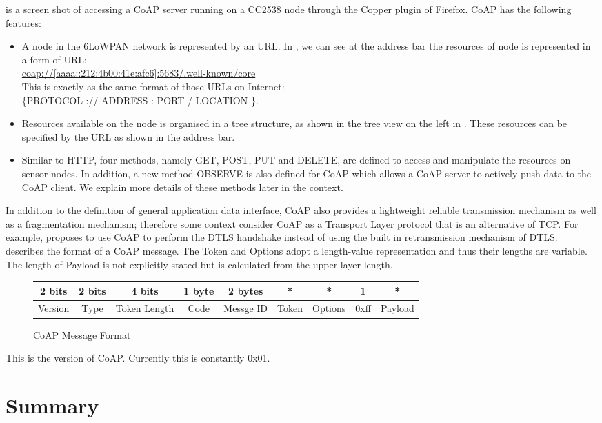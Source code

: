  is a screen shot of accessing a CoAP server running on a CC2538 node through the Copper plugin of Firefox. CoAP has the following features:
\begin{itemize}
	\item A node in the 6LoWPAN network is represented by an URL. In , we can see at the address bar the resources of node is represented in a form of URL:\\
	\url{coap://[aaaa::212:4b00:41e:afc6]:5683/.well-known/core} \\
	This is exactly as the same format of those URLs on Internet: \\
	 \{PROTOCOL :// ADDRESS : PORT / LOCATION \}.
	 \item Resources available on the node is organised in a tree structure, as shown in the tree view on the left in . These resources can be specified by the URL as shown in the address bar.
	 \item Similar to HTTP, four methods, namely GET, POST, PUT and DELETE, are defined to access and manipulate the resources on sensor nodes. In addition, a new method OBSERVE is also defined for CoAP which allows a CoAP server to actively push data to the CoAP client. We explain more details of these methods later in the context.
\end{itemize}
In addition to the definition of general application data interface, CoAP also provides a lightweight reliable transmission mechanism as well as a fragmentation mechanism; therefore some context consider CoAP as a Transport Layer protocol that is an alternative of TCP. For example, \cite{CoDTLS} proposes to use CoAP to perform the DTLS handshake instead of using the built in retransmission mechanism of DTLS.
 describes the format of a CoAP message. The Token and Options adopt a length-value representation and thus their lengths are variable. The length of Payload is not explicitly stated but is calculated from the upper layer length.
\begin{figure}[h!]
	\begin{tabular}{|c|c|c|c|c|c|c|c|c|}
	\hline
	2 bits  & 2 bits & 4 bits       & 1 byte & 2 bytes   & * & *       & 1    & *       \\ \hline
	Version & Type   & Token Length & Code   & Messge ID & Token                 & Options & 0xff & Payload \\ \hline
	\end{tabular}
	\caption{CoAP Message Format}
	\label{Fig: CoAP Message Format}
\end{figure}

\begin{description}[style=nextline]
	\item[\textbf{Version}]
	This is the version of CoAP. Currently this is constantly 0x01.
	\item[\textbf{Type}]
\end{description}


\section{Summary}
